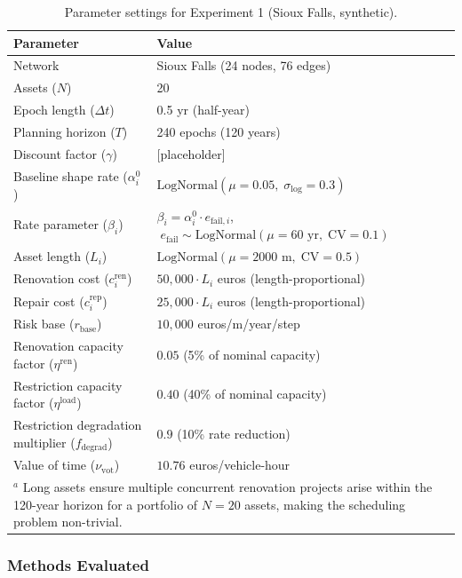 \documentclass[3p, twocolumn]{elsarticle}
\begin{document}
\begin{table}[htpb]
\centering
\caption{Parameter settings for Experiment 1 (Sioux Falls, synthetic).}
\label{tab:exp1_params}
\small
\begin{tabular}{ll}
\hline
\textbf{Parameter} & \textbf{Value} \\
\hline
Network             & Sioux Falls (24 nodes, 76 edges) \\
Assets ($N$)        & 20 \\
Epoch length ($\Delta t$)  & 0.5 yr (half-year) \\
Planning horizon ($T$)    & 240 epochs (120 years) \\
Discount factor ($\gamma$) & [placeholder] \\
Baseline shape rate ($\alpha_i^0$) & $\mathrm{LogNormal}(\mu = 0.05,\; \sigma_{\log} = 0.3)$ \\
Rate parameter ($\beta_i$) & $\beta_i = \alpha_i^0 \cdot e_{\mathrm{fail},i}$, $\;e_{\mathrm{fail}} \sim \mathrm{LogNormal}(\mu = 60\text{ yr},\; \mathrm{CV} = 0.1)$ \\
Asset length ($L_i$)       & $\mathrm{LogNormal}(\mu = 2000\text{ m},\; \mathrm{CV} = 0.5)$\tnote{a} \\
Renovation cost ($c_i^{\text{ren}}$) & $50{,}000 \cdot L_i$ euros (length-proportional) \\
Repair cost ($c_i^{\text{rep}}$) & $25{,}000 \cdot L_i$ euros (length-proportional) \\
Risk base ($r_{\text{base}}$) & $10{,}000$ euros/m/year/step \\
Renovation capacity factor ($\eta^{\text{ren}}$) & $0.05$ (5\% of nominal capacity) \\
Restriction capacity factor ($\eta^{\text{load}}$) & $0.40$ (40\% of nominal capacity) \\
Restriction degradation multiplier ($f_{\text{degrad}}$) & $0.9$ (10\% rate reduction) \\
Value of time ($\nu_{\text{vot}}$) & $10.76$ euros/vehicle-hour \\
\hline
\multicolumn{2}{l}{\footnotesize $^a$ Long assets ensure multiple concurrent renovation
projects arise within the 120-year horizon for a portfolio of $N=20$ assets, making the
scheduling problem non-trivial.} \\
\end{tabular}
\end{table}

\subsubsection{Methods Evaluated}
\end{document}
